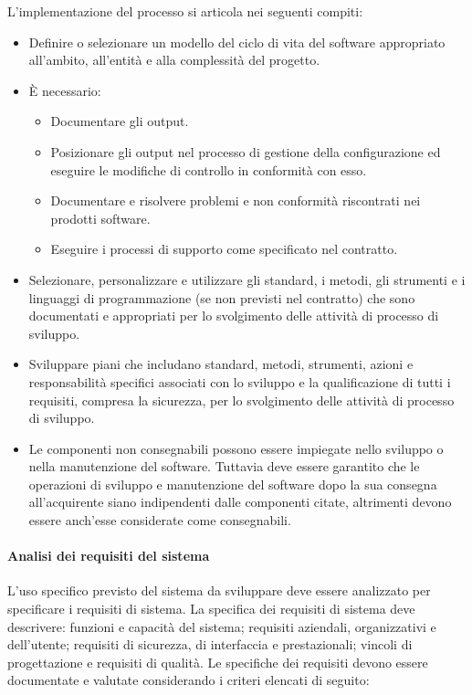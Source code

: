 \documentclass[../../norme-di-progetto.tex]{subfiles}
\begin{document}
L'implementazione del processo si articola nei seguenti compiti:

\begin{itemize}
  \item Definire o selezionare un modello del ciclo di vita del software appropriato all'ambito, all'entità e alla complessità del progetto.
  \item È necessario:
        \begin{itemize}
          \item Documentare gli output.
          \item Posizionare gli output nel processo di gestione della configurazione ed eseguire le modifiche di controllo in conformità con esso.
          \item Documentare e risolvere problemi e non conformità riscontrati nei prodotti software.
          \item Eseguire i processi di supporto come specificato nel contratto.
        \end{itemize}
  \item Selezionare, personalizzare e utilizzare gli standard, i metodi, gli strumenti e i linguaggi di programmazione (se non previsti nel contratto) che sono documentati e appropriati per lo svolgimento delle attività di processo di sviluppo.
  \item Sviluppare piani che includano standard, metodi, strumenti, azioni e responsabilità specifici associati con lo sviluppo e la qualificazione di tutti i requisiti, compresa la sicurezza, per lo svolgimento delle attività di processo di sviluppo.
  \item Le componenti non consegnabili possono essere impiegate nello sviluppo o nella manutenzione del software. Tuttavia deve essere garantito che le operazioni di sviluppo e manutenzione del software dopo la sua consegna all'acquirente siano indipendenti dalle componenti citate, altrimenti devono essere anch'esse considerate come consegnabili.
\end{itemize}

\paragraph{Analisi dei requisiti del sistema}%
\label{par:analisi_dei_requisiti_del_sistema}

L'uso specifico previsto del sistema da sviluppare deve essere analizzato per specificare i requisiti di sistema. La specifica dei requisiti di sistema deve descrivere: funzioni e capacità del sistema; requisiti aziendali, organizzativi e dell'utente; requisiti di sicurezza, di interfaccia e prestazionali; vincoli di progettazione e requisiti di qualità. Le specifiche dei requisiti devono essere documentate e valutate considerando i criteri elencati di seguito:
\end{document}
